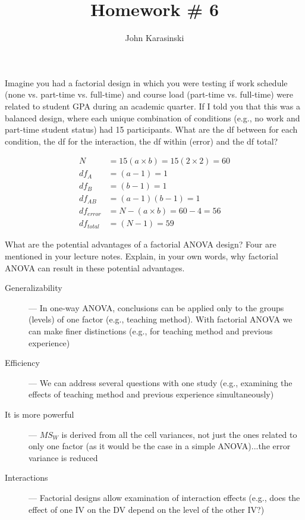 \documentclass[onecolumn,10pt]{jhwhw}
\author{John Karasinski}
\title{Homework \# 6}
\begin{document}

\problem{}
Imagine you had a factorial design in which you were testing if work schedule (none vs. part-time vs. full-time) and course load (part-time vs. full-time) were related to student GPA during an academic quarter. If I told you that this was a balanced design, where each unique combination of conditions (e.g., no work and part-time student status) had 15 participants. What are the df between for each condition, the df for the interaction, the df within (error) and the df total?

\begin{align*}
N &= 15 (a \times b) = 15 (2 \times 2) = 60\\
df_A &= (a - 1) = 1\\
df_B &= (b - 1) = 1\\
df_{AB} &= (a-1)(b-1) = 1\\
df_{error} &= N - (a \times b) = 60 - 4 = 56\\
df_{total} &= (N - 1) = 59
\end{align*}


\problem{}
What are the potential advantages of a factorial ANOVA design? Four are mentioned in your lecture notes. Explain, in your own words, why factorial ANOVA can result in these potential advantages.

\begin{description}
\item[Generalizability] --- In one-way ANOVA, conclusions can be applied only to the groups (levels) of one factor (e.g., teaching method). With factorial ANOVA we can make finer distinctions (e.g., for teaching method and previous experience)
\item[Efficiency] --- We can address several questions with one study (e.g., examining the effects of teaching method and previous experience simultaneously)
\item[It is more powerful] --- $MS_W$ is derived from all the cell variances, not just the ones related to only one factor (as it would be the case in a simple ANOVA)...the error variance is
reduced
\item[Interactions] --- Factorial designs allow examination of interaction effects (e.g., does the effect of one IV on the DV depend on the level of the other IV?)
\end{description}
\end{document}

